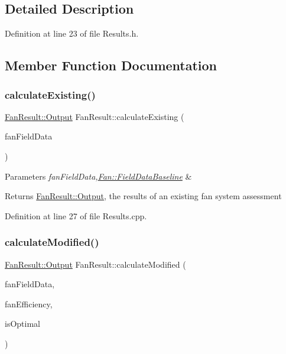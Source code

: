 \subsection{Detailed Description}


Definition at line 23 of file Results.\+h.



\subsection{Member Function Documentation}
\mbox{\label{class_fan_result_ad9bd0cc8f62fcb7bb7aca7eea511a2f3}} 
\subsubsection{\texorpdfstring{calculate\+Existing()}{calculateExisting()}}
{\footnotesize\ttfamily \hyperlink{struct_fan_result_1_1_output}{Fan\+Result\+::\+Output} Fan\+Result\+::calculate\+Existing (\begin{DoxyParamCaption}\item[{\hyperlink{struct_fan_1_1_field_data_baseline}{Fan\+::\+Field\+Data\+Baseline} const \&}]{fan\+Field\+Data }\end{DoxyParamCaption})}


\begin{DoxyParams}{Parameters}
{\em fan\+Field\+Data,\hyperlink{struct_fan_1_1_field_data_baseline}{Fan\+::\+Field\+Data\+Baseline}} & \\
\hline
\end{DoxyParams}
\begin{DoxyReturn}{Returns}
\hyperlink{struct_fan_result_1_1_output}{Fan\+Result\+::\+Output}, the results of an existing fan system assessment 
\end{DoxyReturn}


Definition at line 27 of file Results.\+cpp.

\mbox{\label{class_fan_result_a0c0a90d06749d599b48cf17aa06f0c67}} 
\subsubsection{\texorpdfstring{calculate\+Modified()}{calculateModified()}}
{\footnotesize\ttfamily \hyperlink{struct_fan_result_1_1_output}{Fan\+Result\+::\+Output} Fan\+Result\+::calculate\+Modified (\begin{DoxyParamCaption}\item[{\hyperlink{struct_fan_1_1_field_data_modified_and_optimal}{Fan\+::\+Field\+Data\+Modified\+And\+Optimal} const \&}]{fan\+Field\+Data,  }\item[{double}]{fan\+Efficiency,  }\item[{bool}]{is\+Optimal }\end{DoxyParamCaption})}


